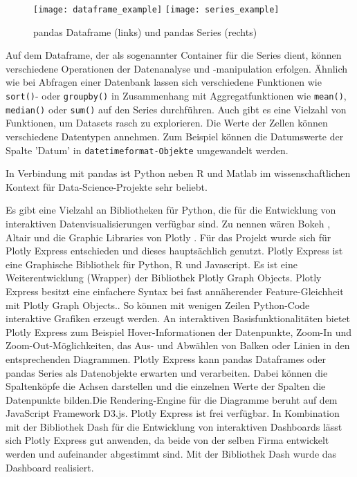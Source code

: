     
    \begin{figure}[h]
        \centering
            \texttt{[image: dataframe\_example]}
            \hspace{1cm}
            \texttt{[image: series\_example]}
            \caption{pandas Dataframe (links) und pandas Series (rechts)}
            \label{fig:pandas Dataframe und pandas Series}
    \end{figure}
    
    Auf dem Dataframe, der als sogenannter Container für die Series dient, können verschiedene Operationen der Datenanalyse und 
    -manipulation erfolgen. Ähnlich wie bei Abfragen einer Datenbank lassen sich verschiedene Funktionen wie \texttt{sort()}- oder \texttt{groupby()}
    in Zusammenhang mit Aggregatfunktionen wie \texttt{mean()}, \texttt{median()} oder \texttt{sum()} auf den Series durchführen.
    Auch gibt es eine Vielzahl von Funktionen, um Datasets rasch zu explorieren. Die Werte der Zellen können verschiedene Datentypen
    annehmen. Zum Beispiel können die Datumswerte der Spalte 'Datum' in \texttt{datetimeformat-Objekte} umgewandelt werden.

    In Verbindung mit pandas ist Python neben \textsf{R} und Matlab im wissenschaftlichen Kontext für Data-Science-Projekte sehr beliebt.
    
    Es gibt eine Vielzahl an Bibliotheken für Python, die für die Entwicklung von interaktiven Datenvisualisierungen verfügbar sind. Zu
    nennen wären Bokeh \cite[vgl.][]{van_de_ven_bokeh_2021}, Altair \cite[vgl.][]{altair_altair_2021} und die 
    Graphic Libraries von Plotly \cite[vgl.][]{plotly_plotly_2021}. Für das Projekt wurde sich für Plotly Express entschieden 
    und dieses hauptsächlich genutzt. 
    Plotly Express ist eine Graphische Bibliothek für Python, \textsf{R} und Javascript. Es ist eine Weiterentwicklung (Wrapper) der Bibliothek Plotly Graph Objects. 
    Plotly Express besitzt eine einfachere Syntax bei fast annäherender Feature-Gleichheit mit Plotly Graph Objects.\cite[][]{plotly_plotly_2021}.
    So können mit wenigen Zeilen Python-Code interaktive Grafiken erzeugt werden. 
    An interaktiven Basisfunktionalitäten bietet Plotly Express zum Beispiel Hover-Informationen der Datenpunkte, Zoom-In und Zoom-Out-Möglichkeiten,
    das Aus- und Abwählen von Balken oder Linien in den entsprechenden Diagrammen. Plotly Express kann pandas Dataframes 
    oder pandas Series als Datenobjekte erwarten und verarbeiten. Dabei können die Spaltenköpfe die Achsen darstellen 
    und die einzelnen Werte der Spalten die Datenpunkte bilden.Die Rendering-Engine für die Diagramme beruht auf dem JavaScript Framework D3.js. 
    Plotly Express ist frei verfügbar. In Kombination mit der Bibliothek Dash für die Entwicklung von interaktiven Dashboards lässt sich Plotly Express gut anwenden, 
    da beide von der selben Firma entwickelt werden und aufeinander abgestimmt sind. Mit der Bibliothek Dash wurde das Dashboard realisiert.
    
